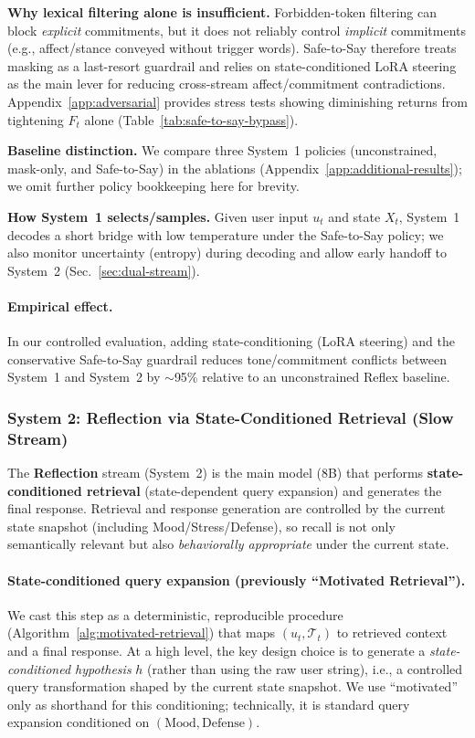 \documentclass{article}
\begin{document}
\textbf{Why lexical filtering alone is insufficient.}
Forbidden-token filtering can block \emph{explicit} commitments, but it does not reliably control \emph{implicit} commitments (e.g., affect/stance conveyed without trigger words).
Safe-to-Say therefore treats masking as a last-resort guardrail and relies on state-conditioned LoRA steering as the main lever for reducing cross-stream affect/commitment contradictions.
Appendix~\ref{app:adversarial} provides stress tests showing diminishing returns from tightening $F_t$ alone (Table~\ref{tab:safe-to-say-bypass}).

\textbf{Baseline distinction.}
We compare three System~1 policies (unconstrained, mask-only, and Safe-to-Say) in the ablations (Appendix~\ref{app:additional-results}); we omit further policy bookkeeping here for brevity.

\textbf{How System~1 selects/samples.}
Given user input $u_t$ and state $X_t$, System~1 decodes a short bridge with low temperature under the Safe-to-Say policy; we also monitor uncertainty (entropy) during decoding and allow early handoff to System~2 (Sec.~\ref{sec:dual-stream}).

\paragraph{Empirical effect.}
In our controlled evaluation, adding state-conditioning (LoRA steering) and the conservative Safe-to-Say guardrail reduces tone/commitment conflicts between System~1 and System~2 by $\sim$95\% relative to an unconstrained Reflex baseline.

\subsubsection{System 2: Reflection via State-Conditioned Retrieval (Slow Stream)}
\label{sec:motivated-retrieval}

The \textbf{Reflection} stream (System~2) is the main model (8B) that performs \textbf{state-conditioned retrieval} (state-dependent query expansion) and generates the final response.
Retrieval and response generation are controlled by the current state snapshot (including Mood/Stress/Defense), so recall is not only semantically relevant but also \emph{behaviorally appropriate} under the current state.

\paragraph{State-conditioned query expansion (previously ``Motivated Retrieval'').}
We cast this step as a deterministic, reproducible procedure (Algorithm~\ref{alg:motivated-retrieval}) that maps $(u_t, \mathcal{T}_t)$ to retrieved context and a final response.
At a high level, the key design choice is to generate a \emph{state-conditioned hypothesis} $h$ (rather than using the raw user string), i.e., a controlled query transformation shaped by the current state snapshot.
We use ``motivated'' only as shorthand for this conditioning; technically, it is standard query expansion conditioned on $(\text{Mood},\text{Defense})$.
\end{document}
